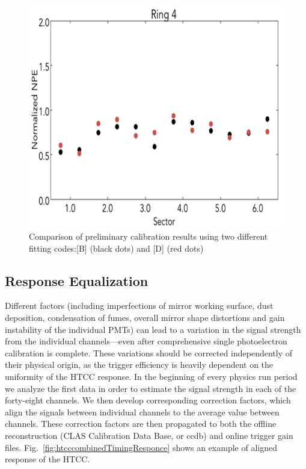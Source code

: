 \begin{figure}[ht]
\centering
\includegraphics[width=0.99\linewidth]{images/WILLIAM_4.png}
\caption{Comparison of preliminary calibration results using two different fitting codes:[B] (black dots) and [D] (red dots)}
\label{fig:WILLIAM_4}
\end{figure}

\subsection{Response Equalization} Different factors (including imperfections of mirror working surface, dust deposition, condensation of fumes, overall mirror shape distortions and gain instability of the individual PMTs) can lead to a variation in the signal strength from the individual channels---even after comprehensive single photoelectron calibration is complete. These variations should be corrected independently of their physical origin, as the trigger efficiency is heavily dependent on the uniformity of the HTCC response. In the beginning of every physics run period we analyze the first data in order to estimate the signal strength in each of the forty-eight channels. We then develop corresponding correction factors, which align the signals between individual channels to the average value between channels. These correction factors are then propagated to both the offline reconstruction (CLAS Calibration Data Base, or ccdb) and online trigger gain files. Fig.~\ref{fig:htcccombinedTimingResponce} shows an example of aligned response of the HTCC.

